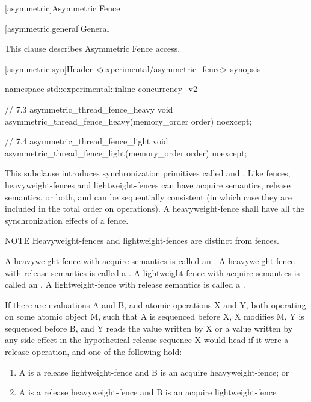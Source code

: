 
[asymmetric]{Asymmetric Fence}

[asymmetric.general]{General}

This clause describes Asymmetric Fence access. 


[asymmetric.syn]{Header <experimental/asymmetric_fence> synopsis}


\begin{codeblock}
namespace std::experimental::inline concurrency_v2 {

// 7.3 asymmetric_thread_fence_heavy
void asymmetric_thread_fence_heavy(memory_order order) noexcept;

// 7.4 asymmetric_thread_fence_light
void asymmetric_thread_fence_light(memory_order order) noexcept;
}
\end{codeblock}


This subclause introduces synchronization primitives called  and
. Like fences, heavyweight-fences and lightweight-fences can have acquire
semantics, release semantics, or both, and can be sequentially consistent (in which case they
are included in the total order  on  operations).
A heavyweight-fence shall have all the
synchronization effects of a fence. %

NOTE
Heavyweight-fences and
lightweight-fences are distinct from fences.

A heavyweight-fence with acquire semantics is called an . A
heavyweight-fence with release semantics is called a . A
lightweight-fence with acquire semantics is called an . A
lightweight-fence with release semantics is called a .

If there are evaluations A and B, and atomic operations X and Y, both operating on some atomic
object M, such that A is sequenced before X, X modifies M, Y is sequenced before B, and Y
reads the value written by X or a value written by any side effect in the hypothetical release
sequence X would head if it were a release operation, and one of the following hold:
\begin{enumerate}
    \item  A is a release lightweight-fence and B is an acquire heavyweight-fence; or
\item  A is a release heavyweight-fence and B is an acquire lightweight-fence
\end{enumerate}

